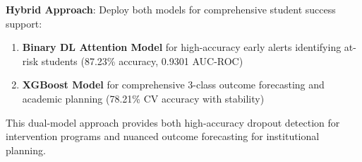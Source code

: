\textbf{Hybrid Approach}: Deploy both models for comprehensive student success support:
\begin{enumerate}
\item \textbf{Binary DL Attention Model} for high-accuracy early alerts identifying at-risk students (87.23\% accuracy, 0.9301 AUC-ROC)
\item \textbf{XGBoost Model} for comprehensive 3-class outcome forecasting and academic planning (78.21\% CV accuracy with stability)
\end{enumerate}

This dual-model approach provides both high-accuracy dropout detection for intervention programs and nuanced outcome forecasting for institutional planning.
